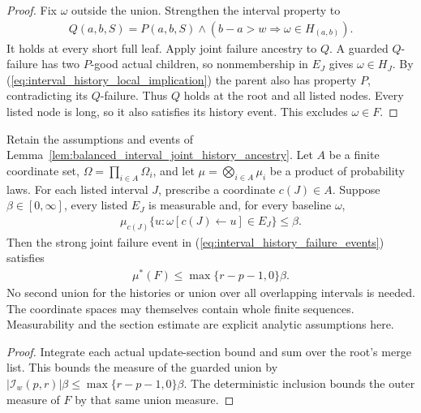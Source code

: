 \begin{proof}\leanok
    Fix $\omega$ outside the union. Strengthen the interval property to
    \begin{align*}
        Q(a,b,S)=P(a,b,S)\land(b-a>w\Longrightarrow\omega\in H_{(a,b)}).
    \end{align*}
    It holds at every short full leaf. Apply joint failure ancestry to
    $Q$. A guarded $Q$-failure has two $P$-good actual children, so
    nonmembership in $E_J$ gives $\omega\in H_J$.
    By (\ref{eq:interval_history_local_implication}) the parent also has
    property $P$, contradicting its $Q$-failure. Thus $Q$ holds at the
    root and all listed nodes. Every listed node is long, so it also
    satisfies its history event. This excludes $\omega\in F$.
\end{proof}

\begin{lemma}
    \label{lem:balanced_interval_joint_history_probability}
    \leanok
    Retain the assumptions and events of
    Lemma~\ref{lem:balanced_interval_joint_history_ancestry}.
    Let $A$ be a finite coordinate set,
    $\Omega=\prod_{i\in A}\Omega_i$, and let
    $\mu=\bigotimes_{i\in A}\mu_i$ be a product of probability laws.
    For each listed interval $J$, prescribe a coordinate $c(J)\in A$.
    Suppose $\beta\in[0,\infty]$, every listed $E_J$ is measurable and,
    for every baseline $\omega$,
    \begin{align}
        \mu_{c(J)}\{u:\omega[c(J)\leftarrow u]\in E_J\}\le\beta.
        \label{eq:interval_history_section_bound}
    \end{align}
    Then the strong joint failure event in
    (\ref{eq:interval_history_failure_events}) satisfies
    \begin{align}
        \mu^*(F)\le\max\{r-p-1,0\}\beta.
        \label{eq:interval_history_joint_probability}
    \end{align}
    No second union for the histories or union over all overlapping
    intervals is needed. The coordinate spaces may themselves contain
    whole finite sequences. Measurability and the section estimate are
    explicit analytic assumptions here.
\end{lemma}
\begin{proof}\leanok
    Integrate each actual update-section bound and sum over the root's
    merge list. This bounds the measure of the guarded union by
    $|\mathcal I_w(p,r)|\beta\le\max\{r-p-1,0\}\beta$.
    The deterministic inclusion bounds the outer measure of $F$ by that
    same union measure.
\end{proof}
